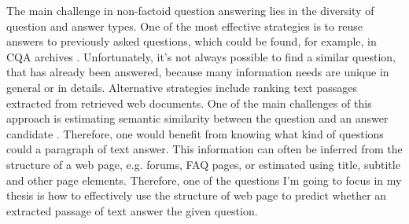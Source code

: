 
The main challenge in non-factoid question answering lies in the diversity of question and answer types.
One of the most effective strategies is to reuse answers to previously asked questions, which could be found, for example, in CQA archives \cite{Shtok:2012:LPA:2187836.2187939}.
Unfortunately, it's not always possible to find a similar question, that has already been answered, because many information needs are unique in general or in details.
Alternative strategies include ranking text passages extracted from retrieved web documents.
One of the main challenges of this approach is estimating semantic similarity between the question and an answer candidate \cite{soricut2006automatic}.
Therefore, one would benefit from knowing what kind of questions could a paragraph of text answer.
This information can often be inferred from the structure of a web page, e.g. forums, FAQ pages, or estimated using title, subtitle and other page elements.
Therefore, one of the questions I'm going to focus in my thesis is how to effectively use the structure of web page to predict whether an extracted passage of text answer the given question.

